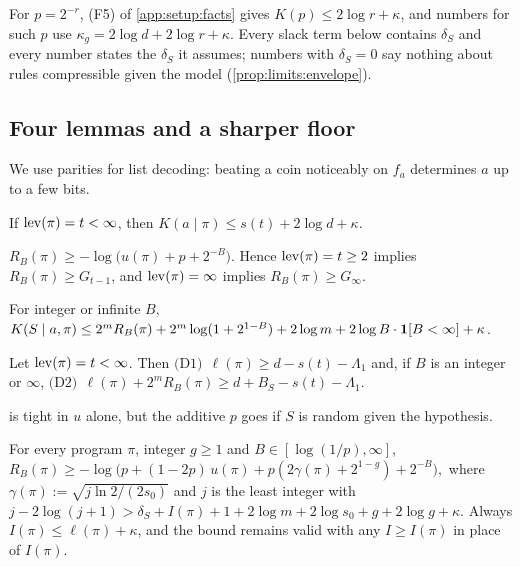 For $p=2^{-r}$, (F5) of \cref{app:setup:facts} gives $K(p)\le2\log r+\kappa$, and numbers for such $p$ use $\kappa_g=2\log d+2\log r+\kappa$. Every slack term below contains $\delta_S$ and every number states the $\delta_S$ it assumes; numbers with $\delta_S=0$ say nothing about rules compressible given the model (\cref{prop:limits:envelope}).

\subsection{Four lemmas and a sharper floor}\label{sec:teacher:lemmas}

We use parities for list decoding: beating a coin noticeably on $f_a$ determines $a$ up to a few bits.

\begin{lemma}\label{lem:teacher:list}
If $\operatorname{lev}(\pi)=t<\infty$, then $K(a\mid\pi)\le s(t)+2\log d+\kappa$.
\end{lemma}

\begin{lemma}\label{lem:teacher:floor}
$R_B(\pi)\ge-\log\big(u(\pi)+p+2^{-B}\big)$. Hence $\operatorname{lev}(\pi)=t\ge2$ implies $R_B(\pi)\ge G_{t-1}$, and $\operatorname{lev}(\pi)=\infty$ implies $R_B(\pi)\ge G_\infty$.
\end{lemma}

\begin{lemma}\label{lem:teacher:coding}
For integer or infinite $B$, $K(S\mid a,\pi)\le2^mR_B(\pi)+2^m\log(1+2^{1-B})+2\log m+2\log B\cdot\mathbf{1}[B<\infty]+\kappa$.
\end{lemma}

\begin{lemma}\label{lem:teacher:twopart}
Let $\operatorname{lev}(\pi)=t<\infty$. Then
\(
\text{(D1)}\ \ \ell(\pi)\ge d-s(t)-\Lambda_1
\)
and, if $B$ is an integer or $\infty$,
\(
\text{(D2)}\ \ \ell(\pi)+2^mR_B(\pi)\ge d+B_S-s(t)-\Lambda_1.
\)
\end{lemma}

 is tight in $u$ alone, but the additive $p$ goes if $S$ is random given the hypothesis.

\begin{lemma}\label{lem:teacher:sharpfloor}
For every program $\pi$, integer $g\ge1$ and $B\in[\log(1/p),\infty]$,
\(
R_B(\pi)\ge-\log\big(p+(1-2p)\,u(\pi)+p(2\gamma(\pi)+2^{1-g})+2^{-B}\big),
\)
where $\gamma(\pi):=\sqrt{j\ln2/(2s_0)}$ and $j$ is the least integer with $j-2\log(j+1)>\delta_S+I(\pi)+1+2\log m+2\log s_0+g+2\log g+\kappa$. Always $I(\pi)\le\ell(\pi)+\kappa$, and the bound remains valid with any $I\ge I(\pi)$ in place of $I(\pi)$.
\end{lemma}

